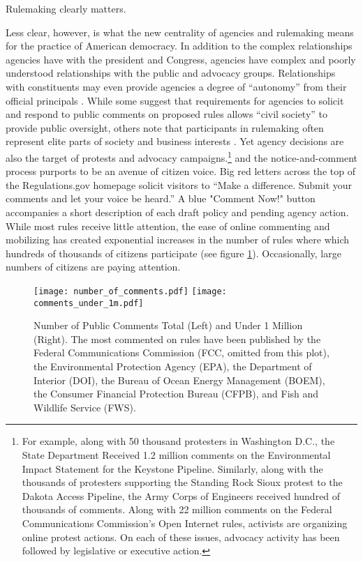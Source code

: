 Rulemaking clearly matters.

Less clear, however, is what the new centrality of agencies and rulemaking means for the practice of American democracy. In addition to the complex relationships agencies have with the president and Congress, agencies have complex and poorly understood relationships with the public and advocacy groups. Relationships with constituents may even provide agencies a degree of ``autonomy'' from their official principals \citep{Carpenter2001}. While some suggest that requirements for agencies to solicit and respond to public comments on proposed rules allows ``civil society'' to provide public oversight, others note that participants in rulemaking often represent elite parts of society \citep{Seifter2016ComplementaryPower} and business interests \citep{Yackee2006a}. Yet agency decisions are also the target of protests and advocacy campaigns.\footnote{For example, along with 50 thousand protesters in Washington D.C., the State Department Received 1.2 million comments on the Environmental Impact Statement for the Keystone Pipeline. Similarly, along with the thousands of protesters supporting the Standing Rock Sioux protest to the Dakota Access Pipeline, the Army Corps of Engineers received hundred of thousands of comments. Along with 22 million comments on the Federal Communications Commission's Open Internet rules, activists are organizing online protest actions. On each of these issues, advocacy activity has been followed by legislative or executive action.} and the notice-and-comment process purports to be an avenue of citizen voice. Big red letters across the top of the Regulations.gov homepage solicit visitors to ``Make a difference. Submit your comments and let your voice be heard.'' A blue "Comment Now!" button accompanies a short description of each draft policy and pending agency action. While most rules receive little attention, the ease of online commenting and mobilizing has created exponential increases in the number of rules where which hundreds of thousands of citizens participate (see figure \ref{fig:comments}). Occasionally, large numbers of citizens are paying attention.

\begin{figure}[!hb]
\caption{Number of Public Comments Total (Left) and Under 1 Million (Right). The most commented on rules have been published by the Federal Communications Commission (FCC, omitted from this plot), the Environmental Protection Agency (EPA), the Department of Interior (DOI), the Bureau of Ocean Energy Management (BOEM), the Consumer Financial Protection Bureau (CFPB), and Fish and Wildlife Service (FWS).}
\texttt{[image: number\_of\_comments.pdf]}
\texttt{[image: comments\_under\_1m.pdf]}
\label{fig:comments}
\end{figure}


